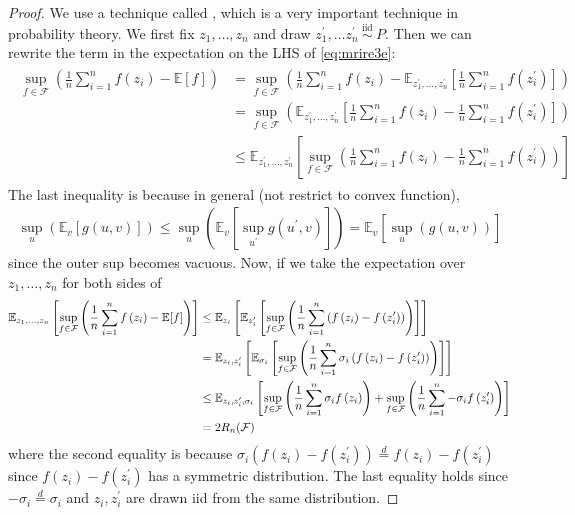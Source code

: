 \documentclass{article}
\begin{document}
\begin{proof}
 We use a technique called , which is a very important technique in probability theory. We first fix $z_{1}, \ldots, z_{n}$ and draw $z_{1}^{\prime}, \ldots z_{n}^{\prime} \stackrel{\text { iid }}{\sim} P .$ Then we can rewrite the term in the expectation on the LHS of \cref{eq:mrire3e}:
\begin{align*}
\begin{aligned}
\sup _{f \in \mathcal{F}}\left(\frac{1}{n} \sum_{i=1}^{n} f\left(z_{i}\right)-\mathbb{E}[f]\right) &=\sup _{f \in \mathcal{F}}\left(\frac{1}{n} \sum_{i=1}^{n} f\left(z_{i}\right)-\mathbb{E}_{z_{1}^{\prime}, \ldots, z_{n}^{\prime}}\left[\frac{1}{n} \sum_{i=1}^{n} f\left(z_{i}^{\prime}\right)\right]\right) \\
&=\sup _{f \in \mathcal{F}}\left(\mathbb{E}_{z_{1}^{\prime}, \ldots, z_{n}^{\prime}}\left[\frac{1}{n} \sum_{i=1}^{n} f\left(z_{i}\right)-\frac{1}{n} \sum_{i=1}^{n} f\left(z_{i}^{\prime}\right)\right]\right) \\
& \leq \mathbb{E}_{z_{1}^{\prime}, \ldots, z_{n}^{\prime}}\left[\sup _{f \in \mathcal{F}}\left(\frac{1}{n} \sum_{i=1}^{n} f\left(z_{i}\right)-\frac{1}{n} \sum_{i=1}^{n} f\left(z_{i}^{\prime}\right)\right)\right]
\end{aligned}
\end{align*}
The last inequality is because in general (not restrict to convex function),
\begin{align*}
\sup _{u}\left(\mathbb{E}_{v}[g(u, v)]\right) \leq \sup _{u}\left(\mathbb{E}_{v}\left[\sup _{u^{\prime}} g\left(u^{\prime}, v\right)\right]\right)=\mathbb{E}_{v}\left[\sup _{u}(g(u, v))\right]
\end{align*}
since the outer sup becomes vacuous.
Now, if we take the expectation over $z_{1}, \ldots, z_{n}$ for both sides of
\begin{align*}
\mathbb{E}_{z_{1}, \ldots, z_{n}}\left[\sup _{f \in \mathcal{F}}\left(\frac{1}{n} \sum_{i=1}^{n} f\left(z_{i}\right)-\mathbb{E}[f]\right)\right] & \leq \mathbb{E}_{z_{i}}\left[\mathbb{E}_{z_{i}^{\prime}}\left[\sup _{f \in \mathcal{F}}\left(\frac{1}{n} \sum_{i=1}^{n}\left(f\left(z_{i}\right)-f\left(z_{i}^{\prime}\right)\right)\right)\right]\right] \nonumber\\ 
&=\mathbb{E}_{z_{i}, z_{i}^{\prime}}\left[\mathbb{E}_{\sigma_{i}}\left[\sup _{f \in \mathcal{F}}\left(\frac{1}{n} \sum_{i=1}^{n} \sigma_{i}\left(f\left(z_{i}\right)-f\left(z_{i}^{\prime}\right)\right)\right)\right]\right] \\
& \leq \mathbb{E}_{z_{i}, z_{i}^{\prime}, \sigma_{i}}\left[\sup _{f \in \mathcal{F}}\left(\frac{1}{n} \sum_{i=1}^{n} \sigma_{i} f\left(z_{i}\right)\right)+\sup _{f \in \mathcal{F}}\left(\frac{1}{n} \sum_{i=1}^{n}-\sigma_{i} f\left(z_{i}^{\prime}\right)\right)\right] \nonumber\\ 
&=2 R_{n}(\mathcal{F})\nonumber\\ 
\end{align*}
where the second equality is because $\sigma_{i}\left(f\left(z_{i}\right)-f\left(z_{i}^{\prime}\right)\right) \stackrel{d}{=} f\left(z_{i}\right)-f\left(z_{i}^{\prime}\right)$ since $f\left(z_{i}\right)-f\left(z_{i}^{\prime}\right)$ has a symmetric distribution. The last equality holds since $-\sigma_{i} \stackrel{d}{=} \sigma_{i}$ and $z_{i}, z_{i}^{\prime}$ are drawn \gls{iid} from the same distribution.
\end{proof}
\end{document}
